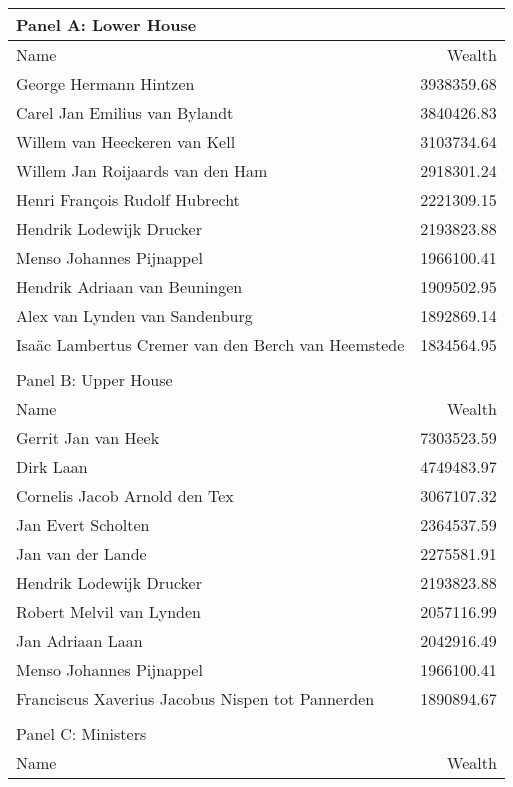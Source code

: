 \begin{table}[ht]
\centering
\begingroup\footnotesize
\begin{tabular}{lr}
   
\multicolumn{2}{l}{Panel A: Lower House}\\ 
\hline
Name & Wealth \\\hline

George Hermann Hintzen & 3938359.68 \\ 
  Carel Jan Emilius van Bylandt & 3840426.83 \\ 
  Willem van Heeckeren van Kell & 3103734.64 \\ 
  Willem Jan Roijaards van den Ham & 2918301.24 \\ 
  Henri François Rudolf Hubrecht & 2221309.15 \\ 
  Hendrik Lodewijk Drucker & 2193823.88 \\ 
  Menso Johannes Pijnappel & 1966100.41 \\ 
  Hendrik Adriaan van Beuningen & 1909502.95 \\ 
  Alex van Lynden van Sandenburg & 1892869.14 \\ 
  Isaäc Lambertus Cremer van den Berch van Heemstede & 1834564.95 \\ 
   \hline\\ 
\multicolumn{2}{l}{Panel B: Upper House}\\ 
\hline
Name & Wealth \\\hline
Gerrit Jan van Heek & 7303523.59 \\ 
  Dirk Laan & 4749483.97 \\ 
  Cornelis Jacob Arnold den Tex & 3067107.32 \\ 
  Jan Evert Scholten & 2364537.59 \\ 
  Jan van der Lande & 2275581.91 \\ 
  Hendrik Lodewijk Drucker & 2193823.88 \\ 
  Robert Melvil van Lynden & 2057116.99 \\ 
  Jan Adriaan Laan & 2042916.49 \\ 
  Menso Johannes Pijnappel & 1966100.41 \\ 
  Franciscus Xaverius Jacobus Nispen tot Pannerden & 1890894.67 \\ 
   \hline\\ 
\multicolumn{2}{l}{Panel C: Ministers}\\ 
\hline
Name & Wealth \\\hline

\end{tabular}
\end{table}
